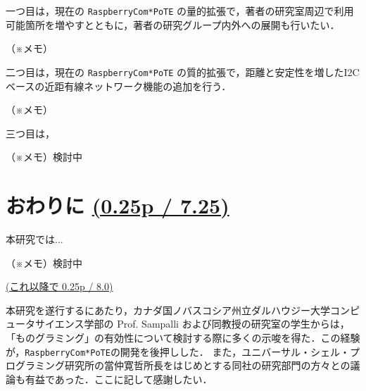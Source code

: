 一つ目は，現在の {\tt Raspberry\-Com*PoTE} の量的拡張で，著者の研究室周辺で利用可能箇所を増やすとともに，著者の研究グループ内外への展開も行いたい．

（※メモ）

二つ目は，現在の {\tt Raspberry\-Com*PoTE} の質的拡張で，距離と安定性を増したI2Cベースの近距有線ネットワーク機能の追加を行う．


（※メモ）

三つ目は，

（※メモ）検討中


\section{おわりに \small{\underline{(0.25p / 7.25)}}}
\label{sec:07conclusion}

本研究では...


（※メモ）検討中


\underline{(これ以降で 0.25p / 8.0)}\\

\begin{acknowledgment}
  本研究を遂行するにあたり，カナダ国ノバスコシア州立ダルハウジー大学コンピュータサイエンス学部の Prof. Sampalli および同教授の研究室の学生からは，「ものグラミング」の有効性について検討する際に多くの示唆を得た．この経験が，{\tt Raspberry\-Com*PoTE}の開発を後押しした．
  また，ユニバーサル・シェル・プログラミング研究所の當仲寛哲所長をはじめとする同社の研究部門の方々との議論も有益であった．ここに記して感謝したい．
\end{acknowledgment}




